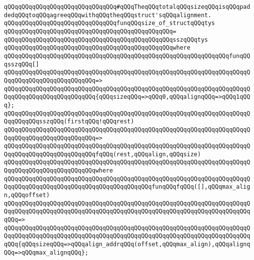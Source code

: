 \verb|qQQqqQQqqQQqqQQqqQQqqQQqqQQqqQQq#qQQqTheqQQqtotalqQQqsizeqQQqisqQQqpaddedqQQqtoqQQqagreeqQQqwithqQQqtheqQQqstruct'sqQQqalignment.|\newline
\newline
\verb|qQQqqQQqqQQqqQQqqQQqqQQqqQQqqQQqfunqQQqsize_of_structqQQqtys|\newline
\verb|qQQqqQQqqQQqqQQqqQQqqQQqqQQqqQQqqQQqqQQqqQQqqQQq=|\newline
\verb|qQQqqQQqqQQqqQQqqQQqqQQqqQQqqQQqqQQqqQQqqQQqqQQqsszqQQqtys|\newline
\verb|qQQqqQQqqQQqqQQqqQQqqQQqqQQqqQQqqQQqqQQqqQQqqQQqwhere|\newline
\verb|qQQqqQQqqQQqqQQqqQQqqQQqqQQqqQQqqQQqqQQqqQQqqQQqqQQqqQQqqQQqqQQqfunqQQqsszqQQq[]|\newline
\verb|qQQqqQQqqQQqqQQqqQQqqQQqqQQqqQQqqQQqqQQqqQQqqQQqqQQqqQQqqQQqqQQqqQQqqQQqqQQqqQQqqQQqqQQqqQQqqQQq=>|\newline
\verb|qQQqqQQqqQQqqQQqqQQqqQQqqQQqqQQqqQQqqQQqqQQqqQQqqQQqqQQqqQQqqQQqqQQqqQQqqQQqqQQqqQQqqQQqqQQqqQQq{qQQqsizeqQQq=>qQQq0,qQQqalignqQQq=>qQQq1qQQq};|\newline
\newline
\verb|qQQqqQQqqQQqqQQqqQQqqQQqqQQqqQQqqQQqqQQqqQQqqQQqqQQqqQQqqQQqqQQqqQQqqQQqqQQqqQQqsszqQQq(firstqQQq!qQQqrest)|\newline
\verb|qQQqqQQqqQQqqQQqqQQqqQQqqQQqqQQqqQQqqQQqqQQqqQQqqQQqqQQqqQQqqQQqqQQqqQQqqQQqqQQqqQQqqQQqqQQqqQQq=>|\newline
\verb|qQQqqQQqqQQqqQQqqQQqqQQqqQQqqQQqqQQqqQQqqQQqqQQqqQQqqQQqqQQqqQQqqQQqqQQqqQQqqQQqqQQqqQQqqQQqqQQqfqQQq(rest,qQQqalign,qQQqsize)|\newline
\verb|qQQqqQQqqQQqqQQqqQQqqQQqqQQqqQQqqQQqqQQqqQQqqQQqqQQqqQQqqQQqqQQqqQQqqQQqqQQqqQQqqQQqqQQqqQQqqQQqwhere|\newline
\verb|qQQqqQQqqQQqqQQqqQQqqQQqqQQqqQQqqQQqqQQqqQQqqQQqqQQqqQQqqQQqqQQqqQQqqQQqqQQqqQQqqQQqqQQqqQQqqQQqqQQqqQQqqQQqqQQqfunqQQqfqQQq([],qQQqmax_align,qQQqoffset)|\newline
\verb|qQQqqQQqqQQqqQQqqQQqqQQqqQQqqQQqqQQqqQQqqQQqqQQqqQQqqQQqqQQqqQQqqQQqqQQqqQQqqQQqqQQqqQQqqQQqqQQqqQQqqQQqqQQqqQQqqQQqqQQqqQQqqQQqqQQqqQQqqQQqqQQq=>|\newline
\verb|qQQqqQQqqQQqqQQqqQQqqQQqqQQqqQQqqQQqqQQqqQQqqQQqqQQqqQQqqQQqqQQqqQQqqQQqqQQqqQQqqQQqqQQqqQQqqQQqqQQqqQQqqQQqqQQqqQQqqQQqqQQqqQQqqQQqqQQqqQQqqQQq{qQQqsizeqQQq=>qQQqalign_addrqQQq(offset,qQQqmax_align),qQQqalignqQQq=>qQQqmax_alignqQQq};|\newline
\newline
